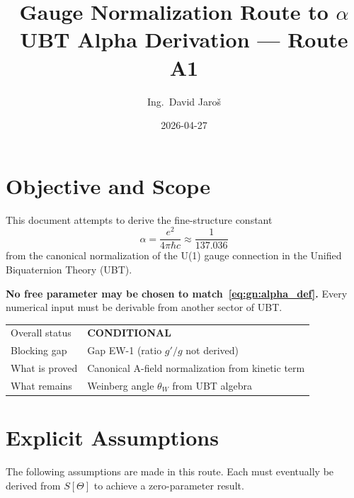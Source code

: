 \documentclass[12pt,a4paper]{article}
\title{\textbf{Gauge Normalization Route to $\alpha$}\\
         \large UBT Alpha Derivation — Route A1}
\author{Ing.\ David Jaro\v{s}}
\date{2026-04-27}
\theoremstyle{definition}
\theoremstyle{remark}
\begin{document}
  \maketitle
\fi

\section{Objective and Scope}
\label{sec:gn:objective}

This document attempts to derive the fine-structure constant
\begin{equation}
  \alpha = \frac{e^2}{4\pi\hbar c} \approx \frac{1}{137.036}
  \label{eq:gn:alpha_def}
\end{equation}
from the canonical normalization of the U(1) gauge connection in the Unified
Biquaternion Theory (UBT).

\textbf{No free parameter may be chosen to match~\eqref{eq:gn:alpha_def}.}
Every numerical input must be derivable from another sector of UBT.

\begin{tcolorbox}[colback=blue!4!white, colframe=blue!50!black, title=Route A1 Status]
\begin{tabular}{ll}
Overall status & \textbf{CONDITIONAL} \\
Blocking gap & Gap EW-1 (ratio $g'/g$ not derived) \\
What is proved & Canonical A-field normalization from kinetic term \\
What remains & Weinberg angle $\theta_W$ from UBT algebra \\
\end{tabular}
\end{tcolorbox}

\section{Explicit Assumptions}
\label{sec:gn:assumptions}

The following assumptions are made in this route.  Each must eventually be derived
from $S[\Theta]$ to achieve a zero-parameter result.
\end{document}
